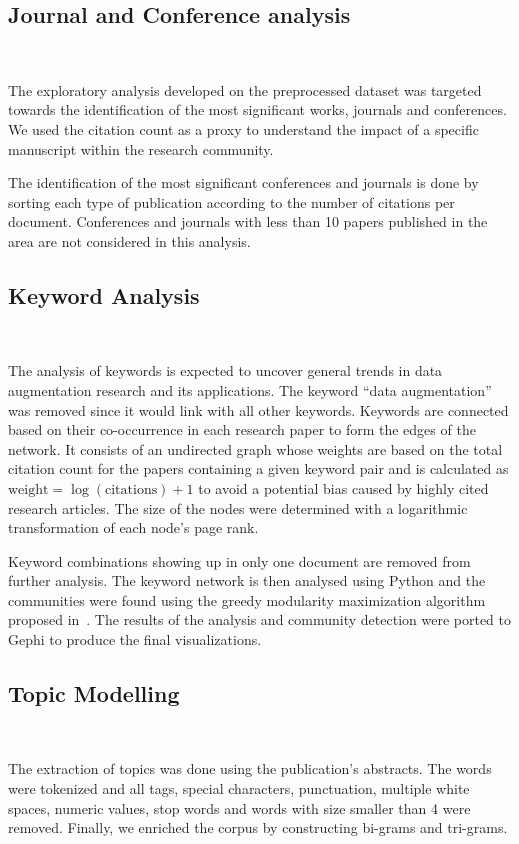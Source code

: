 \documentclass[parskip=full]{scrartcl}
\begin{document}
\subsection{Journal and Conference analysis}~\label{sec:journal_and_conference_analysis}

The exploratory analysis developed on the preprocessed dataset was targeted
towards the identification of the most significant works, journals and
conferences. We used the citation count as a proxy to understand the impact of
a specific manuscript within the research community.

The identification of the most significant conferences and journals is done by
sorting each type of publication according to the number of citations per
document. Conferences and journals with less than 10 papers published in the
area are not considered in this analysis. 

\subsection{Keyword Analysis}~\label{sec:keyword_analysis}

The analysis of keywords is expected to uncover general trends in data
augmentation research and its applications. The keyword ``data augmentation''
was removed since it would link with all other keywords. Keywords are
connected based on their co-occurrence in each research paper to form the
edges of the network.  It consists of an undirected graph whose weights are
based on the total citation count for the papers containing a given keyword
pair and is calculated as $\textrm{weight} = \log(\textrm{citations}) + 1$ to
avoid a potential bias caused by highly cited research articles. The size of
the nodes were determined with a logarithmic transformation of each
node's page rank.

Keyword combinations showing up in only one document are removed from further
analysis. The keyword network is then analysed using Python and the
communities were found using the greedy modularity maximization algorithm
proposed in~\cite{Clauset2004}. The results of the analysis and community
detection were ported to Gephi to produce the final visualizations.

\subsection{Topic Modelling}~\label{sec:topic_modelling}

The extraction of topics was done using the publication's abstracts. The words
were tokenized and all tags, special characters, punctuation, multiple white
spaces, numeric values, stop words and words with size smaller than 4 were
removed. Finally, we enriched the corpus by constructing bi-grams and
tri-grams.
\end{document}

